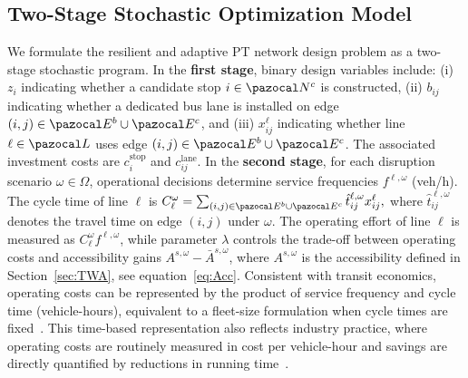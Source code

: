 \documentclass[3p,times,procedia]{elsarticle}
\begin{document}
\subsection{Two-Stage Stochastic Optimization Model}\label{sec:problemFormulation}

We formulate the resilient and adaptive PT network design problem as a two-stage stochastic program.  
In the \textbf{first stage}, binary design variables include: (i) $z_i$ indicating whether a candidate stop $i \in \pazocal N^c$ is constructed, (ii) $b_{ij}$ indicating whether a dedicated bus lane is installed on edge $(i,j) \in \pazocal E^b \cup \pazocal E^c$, and (iii) $x_{ij}^{\ell}$ indicating whether line $\ell \in \pazocal L$ uses edge $(i,j) \in \pazocal E^b \cup \pazocal E^c$. The associated investment costs are $c_i^{\text{stop}}$ and $c_{ij}^{\text{lane}}$.  
In the \textbf{second stage}, for each disruption scenario $\omega \in \Omega$, operational decisions determine service frequencies $f^{\ell,\omega}$ (veh/h). The cycle time of line $\ell$ is
$
C_{\ell}^{\omega}=\sum_{(i,j)\in \pazocal E^b \cup \pazocal E^c}\hat{t}_{ij}^{\ell,\omega}x_{ij}^{\ell},
$
where $\hat{t}_{ij}^{\ell,\omega}$ denotes the travel time on edge $(i,j)$ under $\omega$. The operating effort of line $\ell$ is measured as $C_{\ell}^{\omega} f^{\ell,\omega}$, while parameter $\lambda$ controls the trade-off between operating costs and accessibility gains $A^{s,\omega}-\bar{A}^{s,\omega}$,  where $A^{s,\omega}$ is the accessibility defined in Section~\ref{sec:TWA}, see equation~\eqref{eq:Acc}.   
Consistent with transit economics, operating costs can be represented by the product of service frequency and cycle time (vehicle-hours), equivalent to a fleet-size formulation when cycle times are fixed~\citep{horcher2021public}. This time-based representation also reflects industry practice, where operating costs are routinely measured in cost per vehicle-hour and savings are directly quantified by reductions in running time~\citep{tcrp118}.
\end{document}
